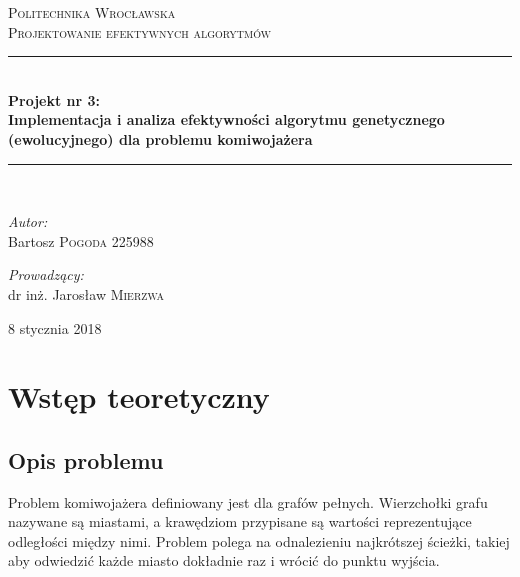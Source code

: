 \documentclass[a4paper,11pt]{article}
\begin{document}
\begin{titlepage}


\newcommand{\HRule}{\rule{\linewidth}{0.5mm}}
\center

\textsc{\LARGE Politechnika Wrocławska}\\[1.5cm]
\textsc{\LARGE Projektowanie efektywnych algorytmów}\\[0.5cm]

\HRule \\[0.5cm]
{ \huge \bfseries Projekt nr 3: \\[0.3cm]Implementacja i analiza efektywności algorytmu genetycznego (ewolucyjnego) dla problemu komiwojażera  }\\[0.5cm] 
\HRule \\[1.5cm]

\begin{flushleft} \large
 
\emph{Autor:}\\
 
Bartosz  \textsc{Pogoda} 225988 \\
 
\end{flushleft}
 
\begin{flushright} \large
 
\emph{Prowadzący:} \\
dr inż. Jarosław \textsc{Mierzwa} 
 
\end{flushright}
 
\vfill
{\large 8 stycznia 2018}\\[3cm] 
 
 
\end{titlepage}

\tableofcontents
\newpage

\section{Wstęp teoretyczny}

\subsection{Opis problemu}

Problem komiwojażera definiowany jest dla grafów pełnych. Wierzchołki grafu nazywane są miastami,
a krawędziom przypisane są wartości reprezentujące odległości między nimi. Problem polega na
odnalezieniu najkrótszej ścieżki, takiej aby odwiedzić każde miasto dokładnie raz i wrócić do punktu
wyjścia. \newline
\end{document}
